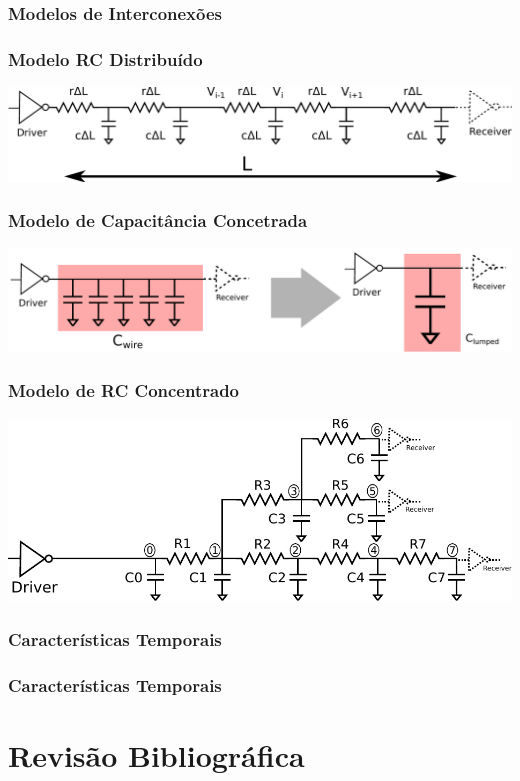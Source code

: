 \documentclass[10pt,a4paper]{beamer}
\begin{document}
			\subsubsection*{Modelos de Interconexões}
				\begin{frame}
					\frametitle{Modelo RC Distribuído}
					\includegraphics[width=\textwidth]{img/distributed_rc.pdf} 
				\end{frame}
				
				\begin{frame}
					\frametitle{Modelo de Capacitância Concetrada}
					\includegraphics[width=\textwidth]{img/lumped_c.pdf} 
				\end{frame}
				
				\begin{frame}
					\frametitle{Modelo de RC Concentrado}
					\includegraphics[width=\textwidth]{img/lumped_rc.pdf} 
				\end{frame}
			
			\subsubsection*{Características Temporais}
			\begin{frame}
				\frametitle{Características Temporais}
			\end{frame}
	
	\section{Revisão Bibliográfica}
	
\end{document}
